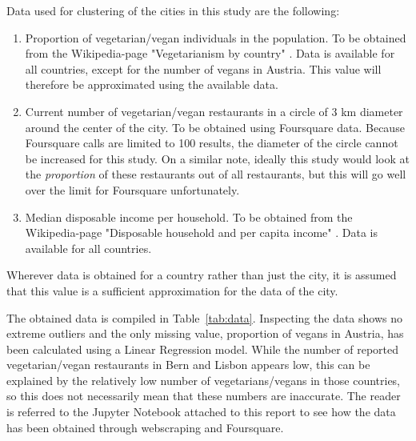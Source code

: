 \documentclass[12pt,a4paper]{article}
\begin{document}
Data used for clustering of the cities in this study are the following:
\begin{enumerate}
	\item Proportion of vegetarian/vegan individuals in the population. To be obtained from the Wikipedia-page "Vegetarianism by country" \cite{wikiVega}. Data is available for all countries, except for the number of vegans in Austria. This value will therefore be approximated using the available data. 
	\item Current number of vegetarian/vegan restaurants in a circle of 3 km diameter around the center of the city. To be obtained using Foursquare data. Because Foursquare calls are limited to 100 results, the diameter of the circle cannot be increased for this study. On a similar note, ideally this study would look at the \textit{proportion} of these restaurants out of all restaurants, but this will go well over the limit for Foursquare unfortunately. 
	\item Median disposable income per household. To be obtained from the Wikipedia-page "Disposable household and per capita income" \cite{wikiIncome}. Data is available for all countries. 
\end{enumerate}
Wherever data is obtained for a country rather than just the city, it is assumed that this value is a sufficient approximation for the data of the city. 

The obtained data is compiled in Table~\ref{tab:data}. Inspecting the data shows no extreme outliers and the only missing value, proportion of vegans in Austria, has been calculated using a Linear Regression model. While the number of reported vegetarian/vegan restaurants in Bern and Lisbon appears low, this can be explained by the relatively low number of vegetarians/vegans in those countries, so this does not necessarily mean that these numbers are inaccurate. The reader is referred to the Jupyter Notebook attached to this report to see how the data has been obtained through webscraping and Foursquare. 
\end{document}
